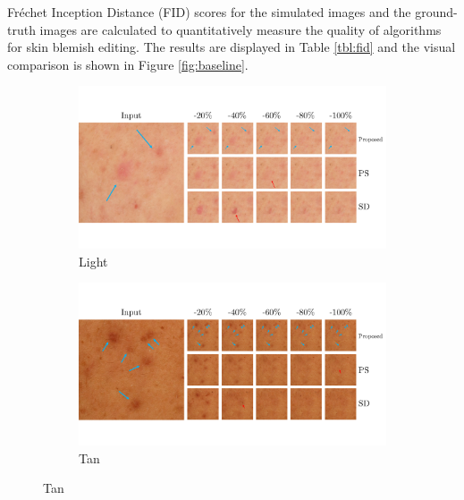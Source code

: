 \begin{spacing}{1.5}
Fréchet Inception Distance (FID) scores for the simulated images and the ground-truth images are calculated to quantitatively measure the quality of algorithms for skin blemish editing. The results are displayed in Table \ref{tbl:fid} and the visual comparison is shown in Figure \ref{fig:baseline}.
\begin{figure}[t!]
    \centering
    \begin{subfigure}{\textwidth}
        \begin{minipage}[c]{.15\textwidth}
            \caption*{Light}
        \end{minipage}%
        \begin{minipage}[c]{.85\textwidth}
            \includegraphics[width=\linewidth]{Chapter5/baseline/baseline41.pdf}
        \end{minipage}
    \end{subfigure}
    \hfill
    \begin{subfigure}{\textwidth}
        \begin{minipage}[c]{.15\textwidth}
            \caption*{Tan}
        \end{minipage}%
        \begin{minipage}[c]{.85\textwidth}
            \includegraphics[width=\linewidth]{Chapter5/baseline/baseline42.pdf}

\end{minipage}
\end{subfigure}
\end{figure}
\end{spacing}
